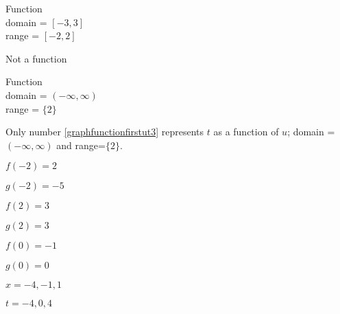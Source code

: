 \begin{exenum}
\item  Function \\  domain =  $[-3,3]$ \\ range =  $[-2,2]$

\item   Not a function

\item  Function \\ domain = $(-\infty, \infty)$ \\ range = $\{2\}$

\item  Only number \ref{graphfunctionfirstut3} represents $t$ as a function of $u$;  domain = $(-\infty, \infty)$ and range=$\{2 \}$.

\end{exenum}

\begin{shortexenum}
      
\item  $f(-2) = 2$

\item $g(-2) = -5$

\item $f(2) = 3$

\item  $g(2) = 3$

\item $f(0) = -1$

\item $g(0) = 0$

\item  $x  = -4, -1, 1$

\item  $t = -4, 0, 4$

\end{shortexenum}

